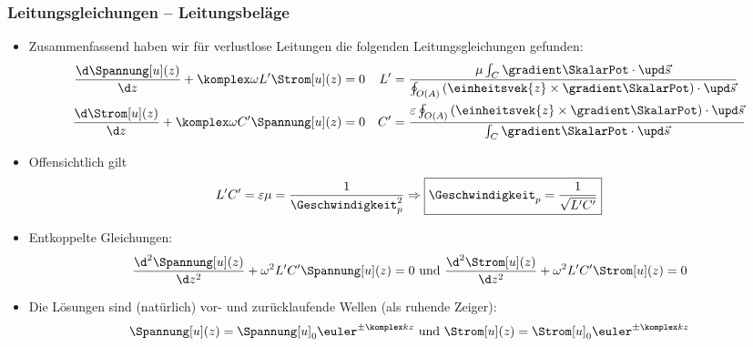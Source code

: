 \begin{frame}
  \frametitle{Leitungsgleichungen -- Leitungsbeläge}
  \begin{itemize}[<+->]
  \item Zusammenfassend haben wir für verlustlose Leitungen die folgenden \alert{Leitungsgleichungen} gefunden:
    \begin{align*}
      \frac{\d \Spannung[u](z)}{\d z} + \komplex\omega L^\prime \Strom[u](z) &= 0 & L^\prime &=\frac{\mu\int_C\gradient\SkalarPot \cdot \upd \vec{s}}{\oint_{O(A)} \left(\einheitsvek{z}\times\gradient\SkalarPot\right) \cdot \upd\vec{s}}\\
      \frac{\d \Strom[u](z)}{\d z} +\komplex\omega C^\prime \Spannung[u](z) & = 0 & C^\prime &= \frac{\varepsilon\oint_{O(A)}\left(\einheitsvek{z}\times \gradient\SkalarPot\right) \cdot \upd \vec{s}}{\int_C \gradient\SkalarPot\cdot\upd\vec{s}}
    \end{align*}
  \item Offensichtlich gilt
    \begin{equation*}
      L^\prime C^\prime = \varepsilon\mu = \frac{1}{\Geschwindigkeit_p^2} \Rightarrow \boxed{\Geschwindigkeit_p = \frac{1}{\sqrt{L^\prime C^\prime}}}
    \end{equation*}
  \item Entkoppelte Gleichungen:
    \begin{equation*}
      \frac{\d^2 \Spannung[u](z)}{\d z^2} + \omega^2 L^\prime C^\prime \Spannung[u](z) = 0 \text{ und } \frac{\d^2 \Strom[u](z)}{\d z^2} + \omega^2 L^\prime C^\prime \Strom[u](z) = 0
    \end{equation*}
  \item Die Lösungen sind (natürlich) vor- und zurücklaufende Wellen (als ruhende Zeiger):
    \begin{equation*}
      \Spannung[u](z) = \Spannung[u]_0 \euler^{\pm\komplex kz} \text{ und } \Strom[u](z) = \Strom[u]_0 \euler^{\pm\komplex kz}
      \end{equation*}
  \end{itemize}
\end{frame}

